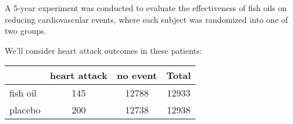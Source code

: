 \documentclass{beamer}
\begin{document}
\begin{frame}
  \begin{example}
    A 5-year experiment was conducted to evaluate the effectiveness of fish oils on reducing cardiovascular events, where each subject was randomized into one of two groups.\pause

    \vspace{1mm}
    We'll consider heart attack outcomes in these patients:
    \begin{center}
      \begin{tabular}{lccc}\hline
        & heart attack & no event & Total \\\hline
        fish oil & 145 & 12788 & 12933 \\
        placebo & 200 & 12738 & 12938 \\\hline
      \end{tabular}
    \end{center}
  \end{example}
\end{frame}
\end{document}
